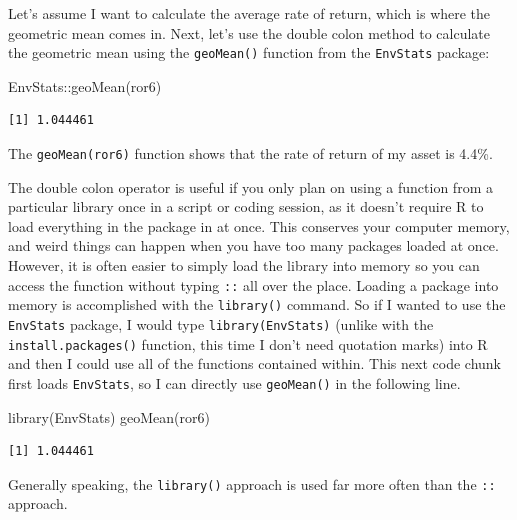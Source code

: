 \documentclass[
  letterpaper,
]{book}
\newenvironment{Shaded}{\begin{snugshade}}{\end{snugshade}}
\newcommand{\FunctionTok}[1]{\textcolor[rgb]{0.28,0.35,0.67}{#1}}
\newcommand{\NormalTok}[1]{\textcolor[rgb]{0.00,0.23,0.31}{#1}}
\newcommand{\SpecialCharTok}[1]{\textcolor[rgb]{0.37,0.37,0.37}{#1}}
\begin{document}
Let's assume I want to calculate the average rate of return, which is
where the geometric mean comes in. Next, let's use the double colon
method to calculate the geometric mean using the \texttt{geoMean()}
function from the \texttt{EnvStats} package:

\begin{Shaded}
\begin{Highlighting}[]
\NormalTok{EnvStats}\SpecialCharTok{::}\FunctionTok{geoMean}\NormalTok{(ror6)}
\end{Highlighting}
\end{Shaded}

\begin{verbatim}
[1] 1.044461
\end{verbatim}

The \texttt{geoMean(ror6)} function shows that the rate of return of my
asset is 4.4\%.

The double colon operator is useful if you only plan on using a function
from a particular library once in a script or coding session, as it
doesn't require R to load everything in the package in at once. This
conserves your computer memory, and weird things can happen when you
have too many packages loaded at once. However, it is often easier to
simply load the library into memory so you can access the function
without typing \texttt{::} all over the place. Loading a package into
memory is accomplished with the \texttt{library()} command. So if I
wanted to use the \texttt{EnvStats} package, I would type
\texttt{library(EnvStats)} (unlike with the \texttt{install.packages()}
function, this time I don't need quotation marks) into R and then I
could use all of the functions contained within. This next code chunk
first loads \texttt{EnvStats}, so I can directly use \texttt{geoMean()}
in the following line.

\begin{Shaded}
\begin{Highlighting}[]
\FunctionTok{library}\NormalTok{(EnvStats)}
\FunctionTok{geoMean}\NormalTok{(ror6)}
\end{Highlighting}
\end{Shaded}

\begin{verbatim}
[1] 1.044461
\end{verbatim}

Generally speaking, the \texttt{library()} approach is used far more
often than the \texttt{::} approach.
\end{document}

